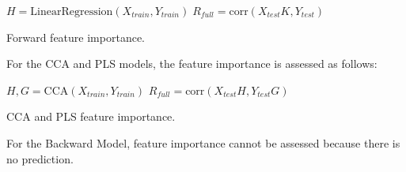 \begin{algorithm}[H]
     

$H = \text{LinearRegression}(X_{train}, Y_{train})\;
R_{full} = \text{corr}(X_{test} K, Y_{test})$\;

     
\caption{Forward feature importance.} \label{algorithm:fwd_fi} \end{algorithm}


For the CCA and PLS models, the feature importance is assessed as follows:

\begin{algorithm}[H]
      $H, G = \text{CCA}(X_{train},
Y_{train})$\; $R_{full} = \text{corr}(X_{test} H, Y_{test} G)$\;

     
\caption{CCA and PLS feature importance.} \label{algorithm:cdp_fi}
\end{algorithm}

For the Backward Model, feature importance cannot be assessed because there is no prediction.

